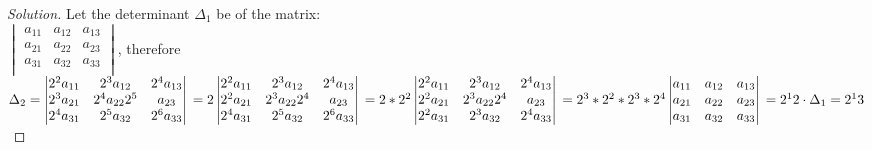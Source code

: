 \begin{proof}
    [Solution]
    Let the determinant $\Delta_1$ be of the matrix:\\
    $\begin{vmatrix}
    a_{11} & a_{12} & a_{13} \\
    a_{21} & a_{22} & a_{23} \\
    a_{31} & a_{32} & a_{33} \\
\end{vmatrix}$, therefore\\
$\Delta_2= \begin{vmatrix}
    2^2 a_{11} & 2^3 a_{12} & 2^4 a_{13} \\
    2^3 a_{21} & 2^4 a_{22} 2^5 & a_{23} \\
    2^4 a_{31} & 2^5 a_{32} & 2^6 a_{33} \\
\end{vmatrix} \\
= 2 \begin{vmatrix}
    2^2 a_{11} & 2^3 a_{12} & 2^4 a_{13} \\
    2^2 a_{21} & 2^3 a_{22} 2^4 & a_{23} \\
    2^4 a_{31} & 2^5 a_{32} & 2^6 a_{33} \\
\end{vmatrix}\\
= 2*2^2 \begin{vmatrix}
    2^2 a_{11} & 2^3 a_{12} & 2^4 a_{13} \\
    2^2 a_{21} & 2^3 a_{22} 2^4 & a_{23} \\
    2^2 a_{31} & 2^3 a_{32} & 2^4 a_{33} \\
\end{vmatrix} \\
= 2^3 * 2^2 *2^3 *2^4 \begin{vmatrix}
    a_{11} & a_{12} & a_{13} \\
    a_{21} & a_{22} & a_{23} \\
    a_{31} & a_{32} & a_{33} \\
\end{vmatrix}\\
= 2^12 \cdot \Delta_1\\
=2^13$
\end{proof}

